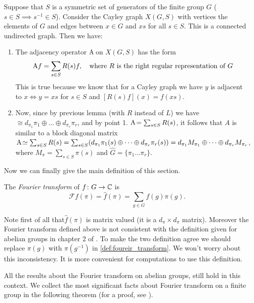 \begin{rem}
Suppose  that $S$  is  a  symmetric  set  of  generators  of  the finite group $G$ ($s\in S \implies s^{-1}\in S$). Consider the Cayley graph $X(G,S)$   with vertices the elements  of $G$  and edges between $x \in G$   and $xs$  for  all $s\in S$.  This is a connected undirected  graph. Then we have:
\begin{enumerate}
\item The adjacency operator $\operatorname{A\!}$ on $X(G,S)$ has the form
\[
\operatorname{A\!} f = \sum_{s\in S}R(s)f, \quad \text{where $R$ is the right regular representation of $G$} \]
This is true because we know that for a Cayley graph we have $y$ is adjacent to $x \iff y=xs$ for $s\in S$ and $[R(s)f](x)=f(xs)$.
\item Now, since by previous lemma (with $R$ instead of $L$) we have $\cong d_{\pi_1}\pi_1\oplus\dots\oplus d_{\pi_r}\pi_r$, and by point 1. $\operatorname{A\!}=\sum_{s\in S}R(s)$, it follows that $A$ is similar to a block diagonal matrix $\operatorname{A\!}\simeq \sum_{s\in S}R(s)=\sum_{s\in S}(d_{\pi_1}\pi_1(s)\oplus\dots\oplus d_{\pi_r}\pi_r(s))= d_{\pi_1}M_{\pi_1}\oplus\dots\oplus d_{\pi_r}M_{\pi_r}$, where $M_\pi=\sum_{s\in S}\pi(s)$ and $\hat{G}=\{\pi_1\dots\pi_r\}$.
\end{enumerate}
\end{rem}
Now we can finally give the main definition of this section.
\begin{defn}
The \emph{Fourier transform} of $f\colon G\rightarrow {\mathbb C}$ is
\begin{equation}
\label{def:foureir_transform}
\mathscr{F}f(\pi)=\hat{f}(\pi)=\sum_{g\in G} f(g)\pi(g).
\end{equation}
\end{defn}
\begin{rem}
Note first of all that$\hat{f}(\pi)$ is matrix valued (it is a $d_\pi\times d_\pi$ matrix). Moreover the Fourier transform  defined  above is not consistent with the definition given for abelian groups in chapter 2 of \cite{terras_1999}. To make the two definition agree we should replace $\pi(g)$ with $\pi(g^{-1})$ in \eqref{def:foureir_transform}.    We won't  worry  about this inconsistency. It is more convenient for computations to use this  definition.
\end{rem}
All the results about the Fourier transform on abelian groups, still hold in this context. We collect the most significant facts about Fourier transform on a finite group in the following theorem (for a proof, see \cite{terras_1999}).
